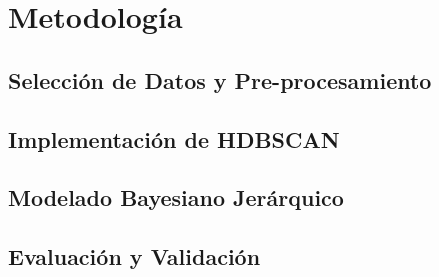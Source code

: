 \documentclass[../Main.tex]{subfiles}
\begin{document}
\section{Metodología}

\subsection{Selección de Datos y Pre-procesamiento}
\lipsum[1] %

\subsection{Implementación de HDBSCAN}
\lipsum[2] %

\subsection{Modelado Bayesiano Jerárquico}
\lipsum[3] %

\subsection{Evaluación y Validación}
\lipsum[4] %

\biblio
\end{document}
